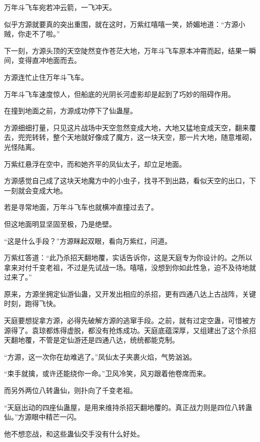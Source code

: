 
\begin{this_body}



万年斗飞车宛若冲云箭，一飞冲天。

似乎方源就要真的突出重围，就在这时，万紫红嘻嘻一笑，娇媚地道：“方源小贼，你走不了啦。”

下一刻，方源头顶的天空陡然变作苍茫大地，万年斗飞车原本冲霄而起，结果一瞬间，变得直冲地面而去。

方源连忙止住万年斗飞车。

万年斗飞车速度惊人，但船底的光阴长河虚影却是起到了巧妙的阻碍作用。

在撞到地面之前，方源成功停下了仙蛊屋。

方源细细打量，只见这片战场中天空忽然变成大地，大地又猛地变成天空，翻来覆去，兜兜转转，整个天地就好像成了魔方，这一块天空，那一片大地，随意堆砌，光怪陆离。

万紫红悬浮在空中，而和她齐平的凤仙太子，却立足地面。

方源感觉自己成了这块天地魔方中的小虫子，找寻不到出路，看似天空的出口，下一刻就会变成大地。

若是寻常地面，万年斗飞车也就横冲直撞过去了。

但这地面明显坚固至极，乃是绝壁。

“这是什么手段？”方源眯起双眼，看向万紫红，问道。

万紫红答道：“此乃杀招天翻地覆，实话告诉你，这是天庭专为你设计的。之所以拿来对付千变老祖，不过是先试战一场。嘻嘻，没想到你如此性急，迫不及待地就过来了。”

原来，方源坐拥定仙游仙蛊，又开发出相应的杀招，更有四通八达上古战阵，关键时刻，跑得飞快。

天庭要想捉拿方源，必得先破解方源的逃窜手段。之前，就有过定空蛊，可惜被方源得了。袁琼都炼得虚脱，都没有抢炼成功。天庭底蕴深厚，又组建出了这个杀招天翻地覆，不管是定仙游还是四通八达，统统都能克制。

“方源，这一次你在劫难逃了。”凤仙太子夹裹火焰，气势汹汹。

“束手就擒，或许还能绕你一命。”卫风冷笑，风刃跟着他卷席而来。

而另外两位八转蛊仙，则扑向了千变老祖。

“天庭出动的四座仙蛊屋，是用来维持杀招天翻地覆的。真正战力则是四位八转蛊仙。”方源眼中精芒一闪。

他不想恋战，和这些蛊仙交手没有什么好处。


\end{this_body}
